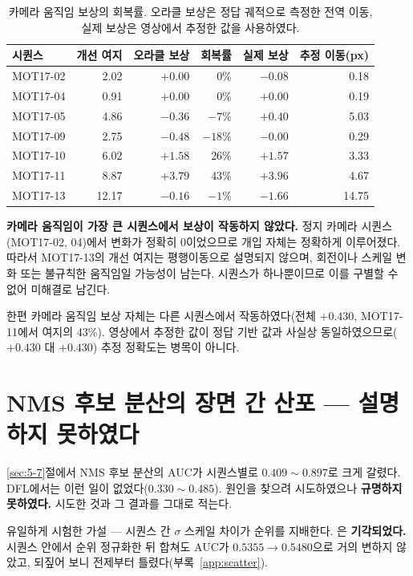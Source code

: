 \documentclass[12pt,a4paper,oneside]{report}
\begin{document}
\begin{table}[htbp]
\centering
\small
\caption{카메라 움직임 보상의 회복률. 오라클 보상은 정답 궤적으로 측정한 전역 이동, 실제 보상은 영상에서 추정한 값을 사용하였다.}
\label{tab:cmc}
\begin{tabular}{lrrrrr}
\toprule
\textbf{시퀀스} & 개선 여지 & 오라클 보상 & 회복률 & 실제 보상 & 추정 이동(px) \\
\midrule
MOT17-02 & 2.02 & $+0.00$ & 0\% & $-0.08$ & 0.18 \\
MOT17-04 & 0.91 & $+0.00$ & 0\% & $+0.00$ & 0.19 \\
MOT17-05 & 4.86 & $-0.36$ & $-7$\% & $+0.40$ & 5.03 \\
MOT17-09 & 2.75 & $-0.48$ & $-18$\% & $-0.00$ & 0.29 \\
MOT17-10 & 6.02 & $+1.58$ & 26\% & $+1.57$ & 3.33 \\
MOT17-11 & 8.87 & $+3.79$ & 43\% & $+3.96$ & 4.67 \\
MOT17-13 & 12.17 & $-0.16$ & $-1$\% & $-1.66$ & 14.75 \\
\bottomrule
\end{tabular}
\end{table}

\textbf{카메라 움직임이 가장 큰 시퀀스에서 보상이 작동하지 않았다.} 정지 카메라 시퀀스(MOT17-02, 04)에서 변화가 정확히 0이었으므로 개입 자체는 정확하게 이루어졌다. 따라서 MOT17-13의 개선 여지는 평행이동으로 설명되지 않으며, 회전이나 스케일 변화 또는 불규칙한 움직임일 가능성이 남는다. 시퀀스가 하나뿐이므로 이를 구별할 수 없어 미해결로 남긴다.

한편 카메라 움직임 보상 자체는 다른 시퀀스에서 작동하였다(전체 $+0.430$, MOT17-11에서 여지의 43\%). 영상에서 추정한 값이 정답 기반 값과 사실상 동일하였으므로($+0.430$ 대 $+0.430$) 추정 정확도는 병목이 아니다.

\section{NMS 후보 분산의 장면 간 산포 --- 설명하지 못하였다}\label{sec:6-4}

\ref{sec:5-7}절에서 NMS 후보 분산의 AUC가 시퀀스별로 $0.409 \sim 0.897$로 크게 갈렸다. DFL에서는 이런 일이 없었다($0.330 \sim 0.485$). 원인을 찾으려 시도하였으나 \textbf{규명하지 못하였다.} 시도한 것과 그 결과를 그대로 적는다.

유일하게 시험한 가설 --- 시퀀스 간 $\sigma$ 스케일 차이가 순위를 지배한다. 은 \textbf{기각되었다.} 시퀀스 안에서 순위 정규화한 뒤 합쳐도 AUC가 $0.5355 \rightarrow 0.5480$으로 거의 변하지 않았고, 되짚어 보니 전제부터 틀렸다(부록~\ref{app:scatter}).
\end{document}

